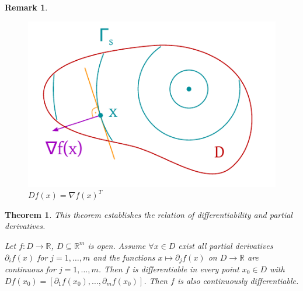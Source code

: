 \documentclass{article}
\newtheorem{theorem}{Theorem}  \numberwithin{theorem}{section}
\newtheorem{remark}{Remark}  \numberwithin{remark}{section}
\begin{document}
\begin{remark}
  \begin{figure}[!h]
    \begin{center}
      \includegraphics{img/33_gradient_2.pdf}
      \caption{$Df(x) = \nabla f(x)^T$}
      \label{img:nab}
    \end{center}
  \end{figure}
\end{remark}

\begin{theorem} %
  \label{thm:rel2}
  This theorem establishes the relation of differentiability and partial derivatives.

  Let $f: D \to \mathbb R$, $D \subseteq \mathbb R^m$ is open.
  Assume $\forall x \in D$ exist all partial derivatives $\partial_i f(x)$ for $j = 1, \dots, m$
  and the functions $x \mapsto \partial_j f(x)$ on $D \to \mathbb R$ are continuous for $j = 1, \dots, m$.
  Then $f$ is differentiable in every point $x_0 \in D$ with $Df(x_0) = [\partial_1 f(x_0), \dots, \partial_m f(x_0)]$.
  Then $f$ is also continuously differentiable.
\end{theorem}
\end{document}
